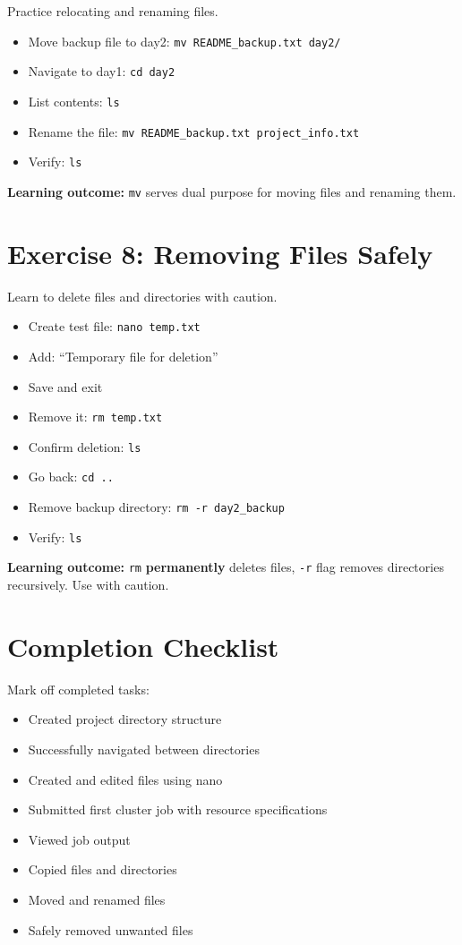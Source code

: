 \documentclass[11pt, a4paper]{article}
\newcommand{\code}[1]{\texttt{#1}}
\newcommand{\checkbox}{$\square$}
\begin{document}
Practice relocating and renaming files.

\begin{itemize}
    \item Move backup file to day2: \code{mv README\_backup.txt day2/}
    \item Navigate to day1: \code{cd day2}
    \item List contents: \code{ls}
    \item Rename the file: \code{mv README\_backup.txt project\_info.txt}
    \item Verify: \code{ls}
\end{itemize}

\textbf{Learning outcome:} \code{mv} serves dual purpose for moving files and renaming them.

\section*{Exercise 8: Removing Files Safely}

Learn to delete files and directories with caution.

\begin{itemize}
    \item Create test file: \code{nano temp.txt}
    \item Add: \enquote{Temporary file for deletion}
    \item Save and exit
    \item Remove it: \code{rm temp.txt}
    \item Confirm deletion: \code{ls}
    \item Go back: \code{cd ..}
    \item Remove backup directory: \code{rm -r day2\_backup}
    \item Verify: \code{ls}
\end{itemize}

\textbf{Learning outcome:} \code{rm} \textbf{permanently} deletes files, \code{-r} flag removes directories recursively. Use with caution.

\section*{Completion Checklist}

Mark off completed tasks:

\begin{itemize}[label=\checkbox]
    \item Created project directory structure
    \item Successfully navigated between directories
    \item Created and edited files using nano
    \item Submitted first cluster job with resource specifications
    \item Viewed job output
    \item Copied files and directories
    \item Moved and renamed files
    \item Safely removed unwanted files
\end{itemize}
\end{document}
